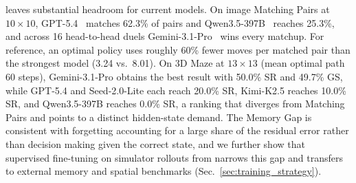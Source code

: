 
\benchname{} leaves substantial headroom for current models. On image Matching Pairs at $10{\times}10$, GPT-5.4~\cite{gpt5.4} matches 62.3\% of pairs and Qwen3.5-397B~\cite{qwen3.5} reaches 25.3\%, and across 16 head-to-head duels Gemini-3.1-Pro~\citep{gemini3.1pro} wins every matchup. For reference, an optimal policy uses roughly 60\% fewer moves per matched pair than the strongest model (3.24 vs.\ 8.01).
On 3D Maze at $13{\times}13$ (mean optimal path 60 steps), Gemini-3.1-Pro obtains the best result with 50.0\% SR and 49.7\% GS, while GPT-5.4 and Seed-2.0-Lite each reach 20.0\% SR, Kimi-K2.5 reaches 10.0\% SR, and Qwen3.5-397B reaches 0.0\% SR, a ranking that diverges from Matching Pairs and points to a distinct hidden-state demand.
The Memory Gap is consistent with forgetting accounting for a large share of the residual error rather than decision making given the correct state, and we further show that supervised fine-tuning on simulator rollouts from \benchname{} narrows this gap and transfers to external memory and spatial benchmarks (Sec.~\ref{sec:training_strategy}).

